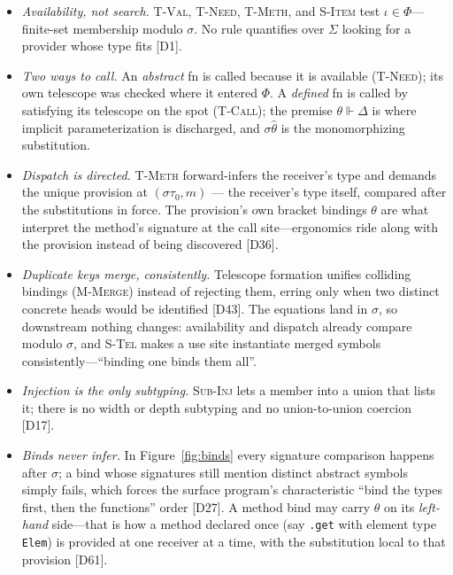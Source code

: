 \documentclass[10pt]{article}
\newcommand{\thh}{\hat\theta}
\newcommand{\entails}{\Vdash}
\newcommand{\smallcode}[1]{\texttt{\small #1}}
\theoremstyle{plain}
\theoremstyle{remark}
\begin{document}
\begin{itemize}
\item \emph{Availability, not search.} \textsc{T-Val}, \textsc{T-Need},
\textsc{T-Meth}, and \textsc{S-Item} test $\iota \in \Phi$---finite-set
membership modulo $\sigma$. No rule quantifies over $\Sigma$ looking for
a provider whose type fits [D1].
\item \emph{Two ways to call.} An \emph{abstract} fn is called because it
is available (\textsc{T-Need}); its own telescope was checked where it
entered $\Phi$. A \emph{defined} fn is called by satisfying its telescope
on the spot (\textsc{T-Call}); the premise $\theta \entails \Delta$ is
where implicit parameterization is discharged, and $\sigma\thh$ is the
monomorphizing substitution.
\item \emph{Dispatch is directed.} \textsc{T-Meth} forward-infers the
receiver's type and demands the unique provision at $(\sigma\tau_0, m)$
--- the receiver's type itself, compared after the substitutions in
force. The provision's own bracket bindings $\theta$
are what interpret the method's signature at the call site---ergonomics
ride along with the provision instead of being discovered [D36].
\item \emph{Duplicate keys merge, consistently.} Telescope formation
unifies colliding bindings (\textsc{M-Merge}) instead of rejecting them,
erring only when two distinct concrete heads would be identified [D43].
The equations land in $\sigma$, so downstream nothing changes: availability
and dispatch already compare modulo $\sigma$, and \textsc{S-Tel} makes a
use site instantiate merged symbols consistently---``binding one binds
them all''.
\item \emph{Injection is the only subtyping.} \textsc{Sub-Inj} lets a
member into a union that lists it; there is no width or depth subtyping
and no union-to-union coercion [D17].
\item \emph{Binds never infer.} In Figure~\ref{fig:binds} every signature
comparison happens after $\sigma$; a bind whose signatures still mention
distinct abstract symbols simply fails, which forces the surface
program's characteristic ``bind the types first, then the functions''
order [D27]. A method bind may carry $\theta$ on its \emph{left-hand}
side---that is how a method declared once (say \smallcode{.get} with
element type \smallcode{Elem}) is provided at one receiver at a time,
with the substitution local to that provision [D61].
\end{itemize}
\end{document}

